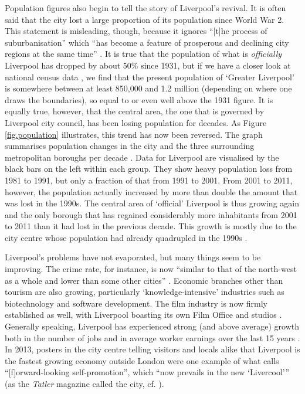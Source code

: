 Population figures also begin to tell the story of Liverpool's revival.
It is often said that the city lost a large proportion of its population since World War 2.
This statement is misleading, though, because it ignores ``[t]he process of suburbanisation'' which ``has become a feature of prosperous and declining city regions at the same time'' \citep[21]{fraser2003}.
It is true that the population of what is \emph{officially} Liverpool has dropped by about 50\% since 1931, but if we have a closer look at national census data \parencite{nomis}, we find that the present population of `Greater Liverpool' is somewhere between at least 850,000 and 1.2 million (depending on where one draws the boundaries), so equal to or even well above the 1931 figure.
It is equally true, however, that the central area, the one that is governed by Liverpool city council, has been losing population for decades.
As Figure \ref{fig.population} illustrates, this trend has now been reversed.
The graph summarises population changes in the city and the three surrounding metropolitan boroughs per decade \parencite{nomis}.
Data for Liverpool are visualised by the black bars on the left within each group.
They show heavy population loss from 1981 to 1991, but only a fraction of that from 1991 to 2001.
From 2001 to 2011, however, the population actually increased by more than double the amount that was lost in the 1990s.
The central area of `official' Liverpool is thus growing again and the only borough that has regained considerably more inhabitants from 2001 to 2011 than it had lost in the previous decade.
This growth is mostly due to the city centre whose population had already quadrupled in the 1990s \citep[cf.][xix]{belchem2006c}.

Liverpool's problems have not evaporated, but many things seem to be improving.
The crime rate, for instance, is now ``similar to that of the north-west as a whole and lower than some other cities''  \citep[235]{pooley2006}.
Economic branches other than tourism are also growing, particularly `knowledge-intensive' industries such as biotechnology \citep[cf.][204]{percy2003} and software development.
The film industry is now firmly established as well, with Liverpool boasting its own Film Office and studios \parencite[cf.][478--480]{murden2006}.
Generally speaking, Liverpool has experienced strong (and above average) growth both in the number of jobs and in average worker earnings over the last 15 years \parencite[cf.][4]{lcc2016}.
In 2013, posters in the city centre telling visitors and locals alike that Liverpool is the fastest growing economy outside London were one example of what \citet[54]{belchem2006a} calls ``[f]orward-looking self-promotion'', which ``now prevails in the new `Livercool'{}'' (as the \emph{Tatler} magazine called the city, cf. \citealt[484]{murden2006}).

